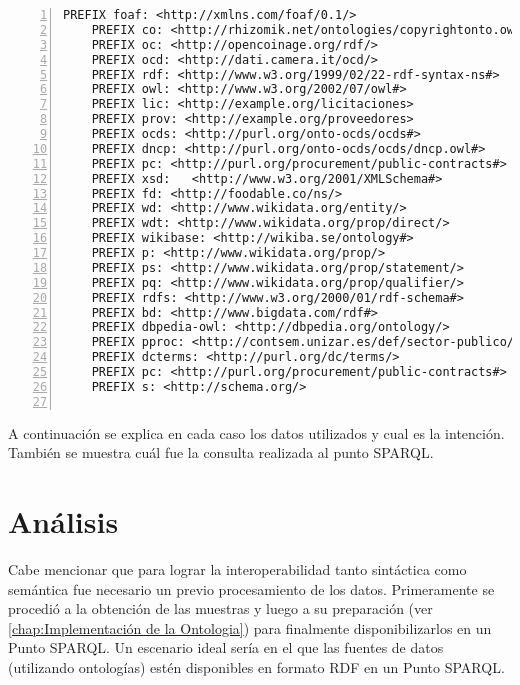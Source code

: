 \noindent\begin{minipage}[t]{\textwidth}
\begin{lstlisting}[captionpos=b, caption={Prefijos de las consultas SPARQL}, label={lst:prefijos},  numbers=left,  numberstyle=\tiny\color{mygray}, 
    basicstyle=\tiny\ttfamily,frame=single]
    PREFIX foaf: <http://xmlns.com/foaf/0.1/>
    PREFIX co: <http://rhizomik.net/ontologies/copyrightonto.owl#>
    PREFIX oc: <http://opencoinage.org/rdf/>
    PREFIX ocd: <http://dati.camera.it/ocd/>
    PREFIX rdf: <http://www.w3.org/1999/02/22-rdf-syntax-ns#>
    PREFIX owl: <http://www.w3.org/2002/07/owl#>
    PREFIX lic: <http://example.org/licitaciones>
    PREFIX prov: <http://example.org/proveedores>
    PREFIX ocds: <http://purl.org/onto-ocds/ocds#>
    PREFIX dncp: <http://purl.org/onto-ocds/ocds/dncp.owl#>
    PREFIX pc: <http://purl.org/procurement/public-contracts#>
    PREFIX xsd:   <http://www.w3.org/2001/XMLSchema#>
    PREFIX fd: <http://foodable.co/ns/>
    PREFIX wd: <http://www.wikidata.org/entity/>
    PREFIX wdt: <http://www.wikidata.org/prop/direct/>
    PREFIX wikibase: <http://wikiba.se/ontology#>
    PREFIX p: <http://www.wikidata.org/prop/>
    PREFIX ps: <http://www.wikidata.org/prop/statement/>
    PREFIX pq: <http://www.wikidata.org/prop/qualifier/>
    PREFIX rdfs: <http://www.w3.org/2000/01/rdf-schema#>
    PREFIX bd: <http://www.bigdata.com/rdf#>
    PREFIX dbpedia-owl: <http://dbpedia.org/ontology/>
    PREFIX pproc: <http://contsem.unizar.es/def/sector-publico/pproc#> 
    PREFIX dcterms: <http://purl.org/dc/terms/> 
    PREFIX pc: <http://purl.org/procurement/public-contracts#> 
    PREFIX s: <http://schema.org/> 
    
 \end{lstlisting}
\end{minipage}

 A continuación se explica en cada caso los datos utilizados y cual es la intención. También se muestra cuál fue la consulta realizada al punto SPARQL.








\section{Análisis}
Cabe mencionar que para lograr la interoperabilidad tanto sintáctica como semántica fue necesario un previo procesamiento de los datos. Primeramente se procedió a la obtención de las muestras y luego a su preparación (ver \ref{chap:Implementación de la Ontologia}) para finalmente disponibilizarlos en un Punto SPARQL. Un escenario ideal sería en el que las fuentes de datos (utilizando ontologías) estén disponibles en formato RDF en un Punto SPARQL.

